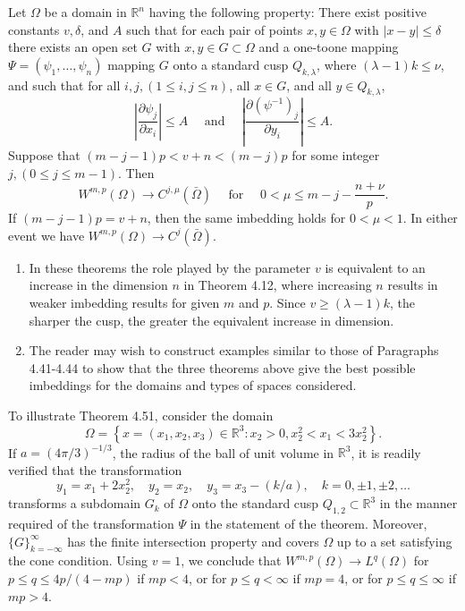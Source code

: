 \begin{theorem}
  Let $\Omega$ be a domain in $\mathbb{R}^n$ having the following property: There exist positive constants $v, \delta$, and $A$ such that for each pair of points $x, y \in \Omega$ with $|x-y| \leq \delta$ there exists an open set $G$ with $x, y \in G \subset \Omega$ and a one-toone mapping $\Psi=\left(\psi_1, \ldots, \psi_n\right)$ mapping $G$ onto a standard cusp $Q_{k, \lambda}$, where $(\lambda-1) k \leq \nu$, and such that for all $i, j,(1 \leq i, j \leq n)$, all $x \in G$, and all $y \in Q_{k, \lambda}$,
  \[
  \left|\frac{\partial \psi_j}{\partial x_i}\right| \leq A \quad \text { and } \quad\left|\frac{\partial\left(\psi^{-1}\right)_j}{\partial y_i}\right| \leq A .
  \]
  Suppose that $(m-j-1) p<v+n<(m-j) p$ for some integer $j,(0 \leq j \leq m-1)$. Then
  \[
  W^{m, p}(\Omega) \rightarrow C^{j, \mu}(\bar{\Omega}) \quad \text { for } \quad 0<\mu \leq m-j-\frac{n+\nu}{p} .
  \]
  If $(m-j-1) p=v+n$, then the same imbedding holds for $0<\mu<1$. In either event we have $W^{m, p}(\Omega) \rightarrow C^j(\bar{\Omega})$.
\end{theorem}


\begin{remarks}
  \begin{enumerate}
    \item In these theorems the role played by the parameter $v$ is equivalent to an increase in the dimension $n$ in Theorem 4.12, where increasing $n$ results in weaker imbedding results for given $m$ and $p$. Since $v \geq(\lambda-1) k$, the sharper the cusp, the greater the equivalent increase in dimension.
    \item The reader may wish to construct examples similar to those of Paragraphs 4.41-4.44 to show that the three theorems above give the best possible imbeddings for the domains and types of spaces considered.
  \end{enumerate}
\end{remarks}


\begin{example}
  To illustrate Theorem 4.51, consider the domain
  \[
  \Omega=\left\{x=\left(x_1, x_2, x_3\right) \in \mathbb{R}^3: x_2>0, x_2^2<x_1<3 x_2^2\right\} .
  \]
  If $a=(4 \pi / 3)^{-1 / 3}$, the radius of the ball of unit volume in $\mathbb{R}^3$, it is readily verified
  that the transformation
  \[
  y_1=x_1+2 x_2^2, \quad y_2=x_2, \quad y_3=x_3-(k / a), \quad k=0, \pm 1, \pm 2, \ldots
  \]
  transforms a subdomain $G_k$ of $\Omega$ onto the standard cusp $Q_{1,2} \subset \mathbb{R}^3$ in the manner required of the transformation $\Psi$ in the statement of the theorem. Moreover, $\{G\}_{k=-\infty}^{\infty}$ has the finite intersection property and covers $\Omega$ up to a set satisfying the cone condition. Using $v=1$, we conclude that $W^{m, p}(\Omega) \rightarrow L^q(\Omega)$ for $p \leq q \leq 4 p /(4-m p)$ if $m p<4$, or for $p \leq q<\infty$ if $m p=4$, or for $p \leq q \leq \infty$ if $m p>4$.
\end{example}


